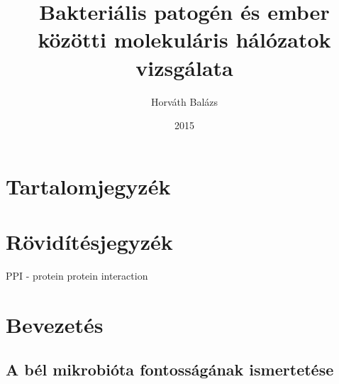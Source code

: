 \documentclass[a4paper,12pt]{article}
\title{Bakteriális patogén és ember közötti molekuláris hálózatok vizsgálata}
\author{Horváth Balázs}
\date{2015}
\begin{document}
\maketitle
\pagebreak

\section{Tartalomjegyzék}
\pagebreak

\section{Rövidítésjegyzék}
PPI - protein protein interaction 
\pagebreak

\section{Bevezetés}
	\subsection{A bél mikrobióta fontosságának ismertetése}
\end{document}

